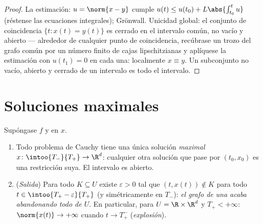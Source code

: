 \begin{proof}
La estimación: $u = \norm{x - y}$ cumple $u(t) \leq u(t_0)
+ L\abs{\int_{t_0}^tu}$ (réstense las ecuaciones integrales); Grönwall.
Unicidad global: el conjunto de coincidencia $\{t : x(t)
= y(t)\}$ es cerrado en el intervalo común, no vacío y abierto ---
alrededor de cualquier punto de coincidencia, recúbrase un trozo
 del grafo común por un número
finito de cajas lipschitzianas y aplíquese la estimación con
$u(t_1) = 0$ en cada una: localmente $x \equiv y$. Un subconjunto no
vacío, abierto y cerrado de un intervalo es todo el intervalo.
\end{proof}

\section{Soluciones maximales}

\begin{theorem}
\label{thm:b3:ode:maximal}
Supóngase $f$  y
 en $x$.
\begin{enumerate}
  \item Todo problema de Cauchy tiene una única solución \emph{maximal}
  $x \colon \intoo{T_-}{T_+} \to \R^d$: cualquier otra solución que pase
  por $(t_0, x_0)$ es una restricción suya. El intervalo es abierto.
  \item (\emph{Salida}) Para todo
   $K \subseteq U$ existe
  $\varepsilon > 0$ tal que $(t, x(t)) \notin
        K$ para todo $t \in \intoo{T_+ - \varepsilon}{T_+}$ (y
  simétricamente en $T_-$): \emph{el grafo de una
   acaba abandonando todo
   de $U$}. En particular,
  para $U = \R\times\R^d$ y $T_+ < +\infty$: $\norm{x(t)} \to +\infty$
  cuando $t \to T_+^-$ (\emph{explosión}).
\end{enumerate}
\end{theorem}

